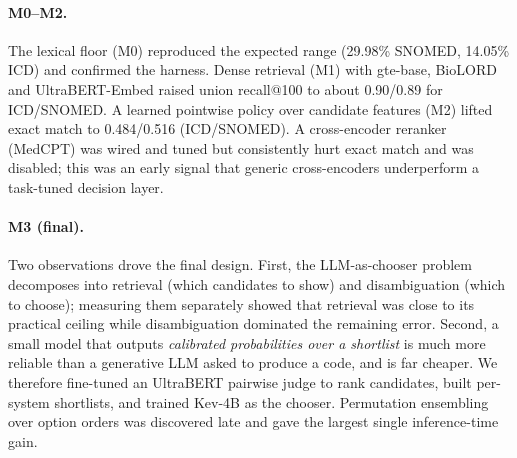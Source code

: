 \documentclass[11pt]{article}
\begin{document}
\paragraph{M0--M2.}
The lexical floor (M0) reproduced the expected range (29.98\% SNOMED, 14.05\% ICD) and
confirmed the harness. Dense retrieval (M1) with gte-base, BioLORD and UltraBERT-Embed
raised union recall@100 to about 0.90/0.89 for ICD/SNOMED. A learned pointwise policy over
candidate features (M2) lifted exact match to 0.484/0.516 (ICD/SNOMED). A cross-encoder reranker
(MedCPT) was wired and tuned but consistently hurt exact match and was disabled; this was
an early signal that generic cross-encoders underperform a task-tuned decision layer.

\paragraph{M3 (final).}
Two observations drove the final design. First, the LLM-as-chooser problem decomposes into
retrieval (which candidates to show) and disambiguation (which to choose); measuring them
separately showed that retrieval was close to its practical ceiling while disambiguation
dominated the remaining error. Second, a small model that outputs \emph{calibrated
probabilities over a shortlist} is much more reliable than a generative LLM asked to
produce a code, and is far cheaper. We therefore fine-tuned an UltraBERT pairwise judge to
rank candidates, built per-system shortlists, and trained Kev-4B as the chooser.
Permutation ensembling over option orders was discovered late and gave the largest
single inference-time gain.
\end{document}
